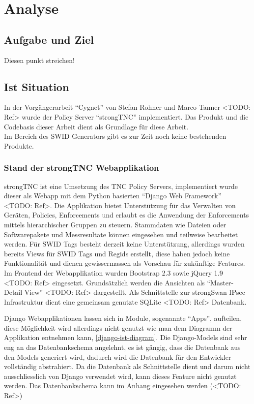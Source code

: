 \chapter{Analyse}

\section{Aufgabe und Ziel}
Diesen punkt streichen!

\section{Ist Situation}
In der Vorgängerarbeit \enquote{Cygnet} von Stefan Rohner und Marco Tanner
<TODO: Ref> wurde der Policy Server \enquote{strongTNC} implementiert. Das
Produkt und die Codebasis dieser Arbeit dient als Grundlage für diese Arbeit.\\
Im Bereich des SWID Generators gibt es zur Zeit noch keine bestehenden Produkte.

\subsection{Stand der strongTNC Webapplikation} 
strongTNC ist eine Umsetzung des TNC Policy Servers, implementiert wurde dieser
als Webapp mit dem Python basierten \enquote{Django Web Framework} <TODO: Ref>.
Die Applikation bietet Unterstützung für das Verwalten von Geräten, Policies,
Enforcements und erlaubt es die Anwendung der Enforcements mittels
hierarchischer Gruppen zu steuern. Stammdaten wie Dateien oder Softwarepakete
und Messresultate können eingesehen und teilweise bearbeitet werden. Für SWID
Tags besteht derzeit keine Unterstützung, allerdings wurden bereits Views für
SWID Tags und Regids erstellt, diese haben jedoch keine Funktionalität und
dienen gewissermassen als Vorschau für zukünftige Features. \\
Im Frontend der Webapplikation wurden Bootstrap 2.3 sowie jQuery 1.9 <TODO:
Ref> eingesetzt. Grundsätzlich werden die Ansichten als \enquote{Master-Detail
View} <TODO: Ref> dargestellt.
Als Schnittstelle zur strongSwan IPsec Infrastruktur dient eine gemeinsam
genutzte SQLite <TODO: Ref> Datenbank. 

Django Webapplikationen lassen sich in Module, sogenannte \enquote{Apps},
aufteilen, diese Möglichkeit wird allerdings nicht genutzt wie man dem
Diagramm der Applikation entnehmen kann, \autoref{django-ist-diagram}. Die
Django-Models sind sehr eng an das Datenbankschema angelehnt, es ist gängig,
dass die Datenbank aus den Models generiert wird, dadurch wird die Datenbank für
den Entwickler vollständig abstrahiert. Da die Datenbank als Schnittstelle dient
und darum nicht ausschliesslich von Django verwendet wird, kann dieses Feature
nicht genutzt werden. Das Datenbankschema kann im Anhang eingesehen werden
(<TODO: Ref>)

